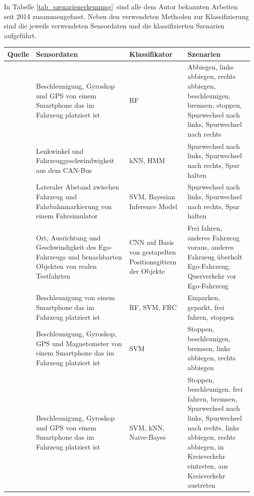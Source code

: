 In Tabelle \ref{tab_szenarienerkennung} sind alle dem Autor bekannten Arbeiten seit 2014 zusammengefasst. Neben den verwendeten Methoden zur Klassifizierung sind die jeweils verwendeten Sensordaten und die klassifizierten Szenarien aufgeführt.

\begin{longtable}[c]{p{} p{4.5cm} p{} p{4.5cm}}
\textbf{Quelle} & \textbf{Sensordaten} & \textbf{Klassifikator} & \textbf{Szenarien} \\
\hline
\endhead

\cite{xie2018driving} & Beschleunigung, Gyroskop und GPS von einem Smartphone das im Fahrzeug platziert ist & \ac{RF} & Abbiegen, links abbiegen, rechts abbiegen, beschleunigen, bremsen, stoppen, Spurwechsel nach links, Spurwechsel nach rechts \\
\hline

\cite{zheng2017lane} & Lenkwinkel und Fahrzeuggeschwindwigkeit aus dem CAN-Bus & \ac{kNN}, \ac{HMM} & Spurwechsel nach links, Spurwechsel nach rechts, Spur halten \\
\hline

\cite{sun2017robust} & Lateraler Abstand zwischen Fahrzeug und Fahrbahnmarkierung von einem Fahrsimulator & \ac{SVM}, Bayesian Inference Model & Spurwechsel nach links, Spurwechsel nach rechts, Spur halten \\
\hline

\cite{gruner2017spatiotemporal} & Ort, Ausrichtung und Geschwindigkeit des Ego-Fahrzeugs und benachbarten Objekten von realen Testfahrten & \ac{CNN} auf Basis von gestapelten Positionsgittern der Objekte & Frei fahren, anderes Fahrzeug voraus, anderes Fahrzeug überholt Ego-Fahrzeug, Querverkehr vor Ego-Fahrzeug \\
\hline

\cite{cervantes2016vehicle} & Beschleunigung von einem Smartphone das im Fahrzeug platziert ist & \ac{RF}, \ac{SVM}, \ac{FRC} & Einparken, geparkt, frei fahren, stoppen \\
\hline

\cite{woo2016manoeuvre} & Beschleunigung, Gyroskop, GPS und Magnetometer von einem Smartphone das im Fahrzeug platziert ist & \ac{SVM} & Stoppen, beschleunigen, bremsen, links abbiegen, rechts abbiegen \\
\hline

\cite{camlica2016feature} & Beschleunigung, Gyroskop und GPS von einem Smartphone das im Fahrzeug platziert ist & \ac{SVM}, \ac{kNN}, Naive-Bayes & Stoppen, beschleunigen, frei fahren, bremsen, Spurwechsel nach links, Spurwechsel nach rechts, links abbiegen, rechts abbiegen, in Kreisverkehr eintreten, aus Kreisverkehr austreten \\
\hline


\end{longtable}
